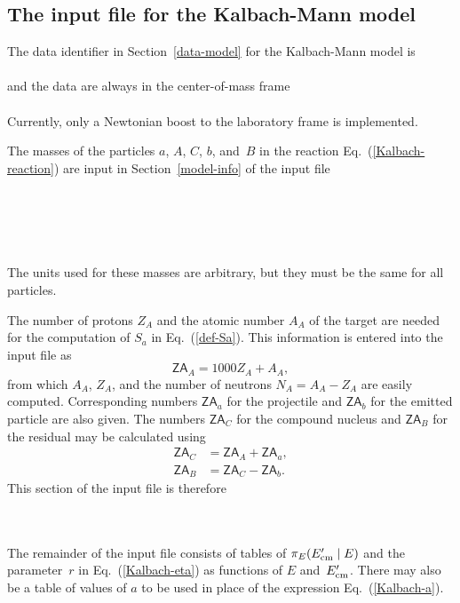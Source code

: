 \subsection{The input file for the Kalbach-Mann model}
The data identifier in Section~\ref{data-model} for the
Kalbach-Mann model is\\
  \\
and the data are always in the center-of-mass frame\\
  \\
Currently, only a Newtonian boost to the laboratory frame is
implemented.

The masses of the particles $a$, $A$, $C$, $b$, and~$B$ in
the reaction Eq.~(\ref{Kalbach-reaction}) are input in Section~\ref{model-info}
of the input file\\
   \\
  \\
  \\
  \\
 \\
The units used for these masses are arbitrary, but they must be the
same for all particles.

The number of protons $Z_A$ and the atomic number $A_A$ of the
target are needed for the computation of $S_a$ in Eq.~(\ref{def-Sa}).
This information is entered into the input file as
$$
  \textsf{ZA}_A = 1000Z_A + A_A,
$$
from which $A_A$, $Z_A$, and the number of neutrons $N_A = A_A - Z_A$
are easily computed.  Corresponding numbers $\textsf{ZA}_a$ for the projectile and
$\textsf{ZA}_b$ for the emitted particle are also given.  The numbers $\textsf{ZA}_C$ for
the compound nucleus and $\textsf{ZA}_B$ for the residual may be calculated
using
\begin{align*}
  \textsf{ZA}_C &= \textsf{ZA}_A + \textsf{ZA}_a,\\
  \textsf{ZA}_B &= \textsf{ZA}_C - \textsf{ZA}_b.
\end{align*}
This section of the input file is therefore\\
   \\
  \\
 
 The remainder of the input file consists of tables of $\pi_E( E_{\text{cm}}' \mid E)$
 and the parameter~$r$ in Eq.~(\ref{Kalbach-eta}) as functions of $E$ and~$E_{\text{cm}}'$.
 There may also be a table of values of $a$ to be used in place of the expression
 Eq.~(\ref{Kalbach-a}).  
 
